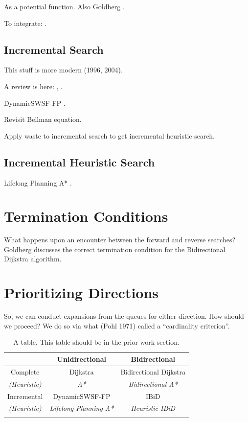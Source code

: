 As a potential function.
Also Goldberg \citep{goldberg2005spexternalmemory}.

To integrate: \citep{dechter1984bfsastaropt}.

\subsection{Incremental Search}

This stuff is more modern (1996, 2004).

A review is here: \citep{eppstein1999dynamic},
\citep{demetrescu2010dynamic}.

DynamicSWSF-FP \citep{ramalingam1996}.

Revisit Bellman equation.

Apply waste to incremental search to get
incremental heuristic search.

\subsection{Incremental Heuristic Search}

Lifelong Planning A* \citep{koenig2004lpastar}.

\section{Termination Conditions}

What happens upon an encounter between the forward and reverse searches?
Goldberg \citep{goldberg2005spexternalmemory}
discusses the correct termination condition for the 
Bidirectional Dijkstra algorithm.

\section{Prioritizing Directions}

So, we can conduct expansions from the queues for either direction.
How should we proceed?
We do so via what (Pohl 1971) called a ``cardinality criterion''.

\begin{table}
\centering
\begin{tabular}{ccc}
   \toprule
   & Unidirectional & Bidirectional \\
   \midrule
   \addlinespace[0.2em]
   Complete
      & Dijkstra \citep{dijkstra1959anote}
      & Bidirectional Dijkstra \citep{luby1989bidijk} \\
   \addlinespace[-0.2em]
   \emph{(Heuristic)}
      & \emph{A* \citep{hart1968astar}}
      & \emph{Bidirectional A* \citep{ikeda1994betterroutes}} \\
   \addlinespace[0.3em]
   Incremental
      & DynamicSWSF-FP \citep{ramalingam1996}
      & {IBiD} \\
   \addlinespace[-0.2em]
   \emph{(Heuristic)}
      & \emph{Lifelong Planning A* \citep{koenig2004lpastar}}
      & \emph{Heuristic IBiD} \\
   \addlinespace[0.2em]
   \bottomrule
\end{tabular}
\caption{A table.
This table should be in the prior work section.}
\end{table}

